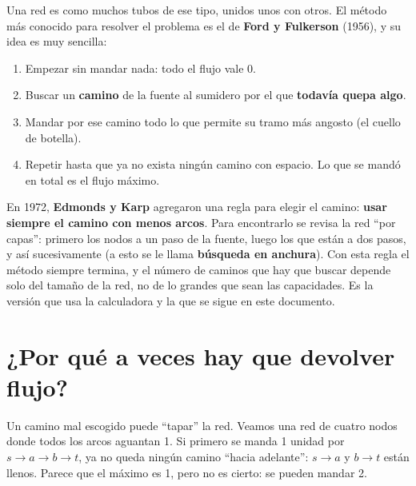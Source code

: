 \documentclass[11pt,a4paper]{article}
\begin{document}
Una red es como muchos tubos de ese tipo, unidos unos con otros. El método más conocido para resolver el problema
es el de \textbf{Ford y Fulkerson} (1956), y su idea es muy sencilla:

\begin{enumerate}[itemsep=3pt]
  \item Empezar sin mandar nada: todo el flujo vale 0.
  \item Buscar un \textbf{camino} de la fuente al sumidero por el que \textbf{todavía quepa algo}.
  \item Mandar por ese camino todo lo que permite su tramo más angosto (el cuello de botella).
  \item Repetir hasta que ya no exista ningún camino con espacio. Lo que se mandó en total es el flujo máximo.
\end{enumerate}

En 1972, \textbf{Edmonds y Karp} agregaron una regla para elegir el camino: \textbf{usar siempre el camino con
menos arcos}. Para encontrarlo se revisa la red ``por capas'': primero los nodos a un paso de la fuente, luego los
que están a dos pasos, y así sucesivamente (a esto se le llama \textbf{búsqueda en anchura}). Con esta regla el
método siempre termina, y el número de caminos que hay que buscar depende solo del tamaño de la red, no de lo
grandes que sean las capacidades. Es la versión que usa la calculadora y la que se sigue en este documento.

\section{¿Por qué a veces hay que devolver flujo?}

Un camino mal escogido puede ``tapar'' la red. Veamos una red de cuatro nodos donde todos los arcos aguantan 1.
Si primero se manda 1 unidad por $s\to a\to b\to t$, ya no queda ningún camino ``hacia adelante'': $s\to a$ y
$b\to t$ están llenos. Parece que el máximo es 1, pero no es cierto: se pueden mandar 2.
\end{document}
